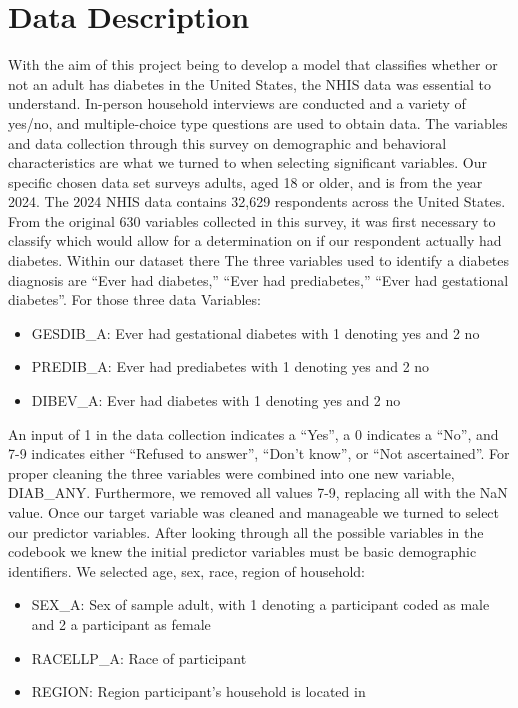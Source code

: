 \documentclass{article}
\theoremstyle{plain}
\theoremstyle{definition}
\theoremstyle{remark}
\begin{document}
\section{Data Description}
\label{submission}
	With the aim of this project being to develop a model that classifies whether or not an adult has diabetes in the United States, the NHIS data was essential to understand. In-person household interviews are conducted and a variety of yes/no, and multiple-choice type questions are used to obtain data. The variables and data collection through this survey on demographic and behavioral characteristics are what we turned to when selecting significant variables. Our specific chosen data set surveys adults, aged 18 or older, and is from the year 2024. The 2024 NHIS data contains 32,629 respondents across the United States. From the original 630 variables collected in this survey, it was first necessary to classify which would allow for a determination on if our respondent actually had diabetes. Within our dataset there The three variables used to identify a diabetes diagnosis are “Ever had diabetes,” “Ever had prediabetes,” “Ever had gestational diabetes”. For those three data Variables: 
\begin{itemize}
    \item GESDIB\_A: Ever had gestational diabetes with 1 denoting yes and 2 no
    \item PREDIB\_A: Ever had prediabetes with 1 denoting yes and 2 no
    \item DIBEV\_A: Ever had diabetes with 1 denoting yes and 2 no
\end{itemize}
An input of 1 in the  data collection indicates a “Yes”, a 0 indicates a “No”, and 7-9 indicates either “Refused to answer”, “Don’t know”, or “Not ascertained”. For proper cleaning the three variables were combined into one new variable, DIAB\_ANY. Furthermore, we removed all values 7-9, replacing all with the NaN value.
Once our target variable was cleaned  and manageable we turned to select our predictor variables. After looking through all the possible variables in the codebook we knew the initial predictor variables must be basic demographic identifiers. We selected age, sex, race, region of household: 
\begin{itemize}
    \item SEX\_A: Sex of sample adult, with 1 denoting a participant coded as male and 2 a participant as female
    \item RACELLP\_A: Race of participant
    \item REGION: Region participant's household is located in
\end{itemize}
\end{document}
